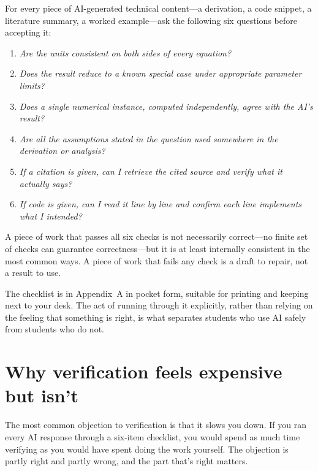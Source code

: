 \documentclass[11pt]{book}
\begin{document}
\begin{tryit}
For every piece of AI-generated technical content---a derivation, a code snippet, a literature summary, a worked example---ask the following six questions before accepting it:
\begin{enumerate}\setlength{\itemsep}{2pt}
\item \emph{Are the units consistent on both sides of every equation?}
\item \emph{Does the result reduce to a known special case under appropriate parameter limits?}
\item \emph{Does a single numerical instance, computed independently, agree with the AI's result?}
\item \emph{Are all the assumptions stated in the question used somewhere in the derivation or analysis?}
\item \emph{If a citation is given, can I retrieve the cited source and verify what it actually says?}
\item \emph{If code is given, can I read it line by line and confirm each line implements what I intended?}
\end{enumerate}
A piece of work that passes all six checks is not necessarily correct---no finite set of checks can guarantee correctness---but it is at least internally consistent in the most common ways. A piece of work that fails any check is a draft to repair, not a result to use.
\end{tryit}

The checklist is in Appendix~A in pocket form, suitable for printing and keeping next to your desk. The act of running through it explicitly, rather than relying on the feeling that something is right, is what separates students who use AI safely from students who do not.

\section{Why verification feels expensive but isn't}

The most common objection to verification is that it slows you down. If you ran every AI response through a six-item checklist, you would spend as much time verifying as you would have spent doing the work yourself. The objection is partly right and partly wrong, and the part that's right matters.
\end{document}
